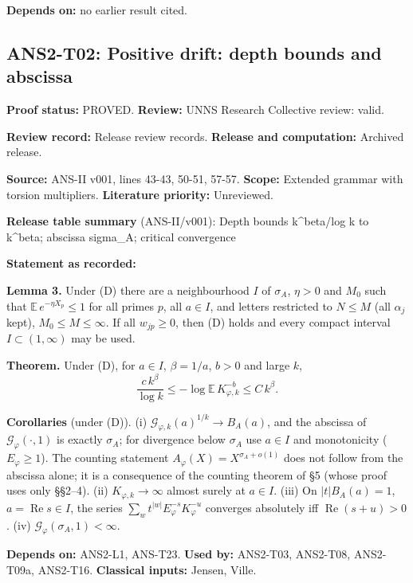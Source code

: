 \documentclass[
  11pt,
]{article}
\begin{document}
\textbf{Depends on:} no earlier result cited.

\hypertarget{ans2-t02-positive-drift-depth-bounds-and-abscissa}{%
\subsection{ANS2-T02: Positive drift: depth bounds and
abscissa}\label{ans2-t02-positive-drift-depth-bounds-and-abscissa}}

\textbf{Proof status:} PROVED. \textbf{Review:} UNNS Research Collective
review: valid.

\textbf{Review record:} Release review records. \textbf{Release and
computation:} Archived release.

\textbf{Source:} ANS-II v001, lines 43-43, 50-51, 57-57. \textbf{Scope:}
Extended grammar with torsion multipliers. \textbf{Literature priority:}
Unreviewed.

\textbf{Release table summary} (ANS-II/v001): Depth bounds k\^{}beta/log
k to k\^{}beta; abscissa sigma\_A; critical convergence

\textbf{Statement as recorded:}

\textbf{Lemma 3.} Under (D) there are a neighbourhood \(I\) of
\(\sigma_A\), \(\eta>0\) and \(M_0\) such that
\(\mathbb E\,e^{-\eta X_p}\le1\) for all primes \(p\), all \(a\in I\),
and letters restricted to \(N\le M\) (all \(\alpha_j\) kept),
\(M_0\le M\le\infty\). If all \(w_{jp}\ge0\), then (D) holds and every
compact interval \(I\subset(1,\infty)\) may be used.

\textbf{Theorem.} Under (D), for \(a\in I\), \(\beta=1/a\), \(b>0\) and
large \(k\),
\[\frac{c\,k^{\beta}}{\log k}\le-\log\mathbb E\,K_{\varphi,k}^{-b}\le C\,k^{\beta}.\]

\textbf{Corollaries} (under (D)). (i)
\(\mathcal G_{\varphi,k}(a)^{1/k}\to B_A(a)\), and the abscissa of
\(\mathcal G_\varphi(\cdot,1)\) is exactly \(\sigma_A\); for divergence
below \(\sigma_A\) use \(a\in I\) and monotonicity (\(E_\varphi\ge1\)).
The counting statement \(A_\varphi(X)=X^{\sigma_A+o(1)}\) does not
follow from the abscissa alone; it is a consequence of the counting
theorem of §5 (whose proof uses only §§2--4). (ii)
\(K_{\varphi,k}\to\infty\) almost surely at \(a\in I\). (iii) On
\(|t|B_A(a)=1\), \(a=\operatorname{Re}s\in I\), the series
\(\sum_wt^{|w|}E_\varphi^{-s}K_\varphi^{-u}\) converges absolutely iff
\(\operatorname{Re}(s+u)>0\). (iv)
\(\mathcal G_\varphi(\sigma_A,1)<\infty\).

\textbf{Depends on:} ANS2-L1, ANS-T23. \textbf{Used by:} ANS2-T03,
ANS2-T08, ANS2-T09a, ANS2-T16. \textbf{Classical inputs:} Jensen, Ville.
\end{document}
